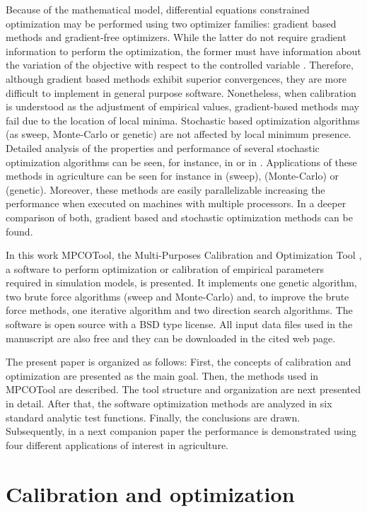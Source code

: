 \documentclass[review,authoryear]{elsarticle}
\begin{document}
Because of the mathematical model, differential equations constrained
optimization may be performed using two optimizer families: gradient based
methods and gradient-free optimizers. While the latter do not require gradient
information to perform the optimization, the former must have information about
the variation of the objective with respect to the controlled variable
\citep{Lacasta16}. Therefore, although gradient based methods exhibit superior
convergences, they are more difficult to implement in general purpose software.
Nonetheless, when calibration is understood as the adjustment of empirical
values, gradient-based methods may fail due to the location of local minima.
Stochastic based optimization algorithms (as sweep, Monte-Carlo or genetic) are
not affected by local minimum presence. 
Detailed analysis of the properties and performance of several stochastic
optimization algorithms can be seen, for instance, in \citet{Back96} or in
\citet{HauptHaupt04}.
Applications of these methods in
agriculture can be seen for instance in \citet{JaviSurcos2} (sweep),
\citet{Ouazaa15} (Monte-Carlo) or \citet{Ebrahimiam13} (genetic). Moreover,
these methods are easily parallelizable increasing the performance when executed
on machines with multiple processors. In \cite{Lacasta16} a deeper comparison of
both, gradient based and stochastic optimization methods can be found.

In this work MPCOTool, the Multi-Purposes Calibration and Optimization Tool
\citep{MPCOToolGit}, a software to perform optimization or calibration of
empirical parameters required in simulation models, is presented. It implements
one genetic algorithm, two brute force algorithms (sweep and Monte-Carlo) and,
to improve the brute force methods, one iterative algorithm and two direction
search algorithms. The software is open source with a BSD type license. All
input data files used in the manuscript are also free and they can be downloaded
in the cited web page.

The present paper is organized as follows: First, the concepts of calibration
and optimization are presented as the main goal. Then, the methods used in MPCOTool are described. The tool structure and organization
are next presented in detail. After that,
the software optimization methods are analyzed in six standard analytic test
functions. Finally, the conclusions are drawn. 
Subsequently, in a next companion paper the performance is demonstrated using
four different applications of interest in agriculture.

\section{Calibration and optimization}
\end{document}
